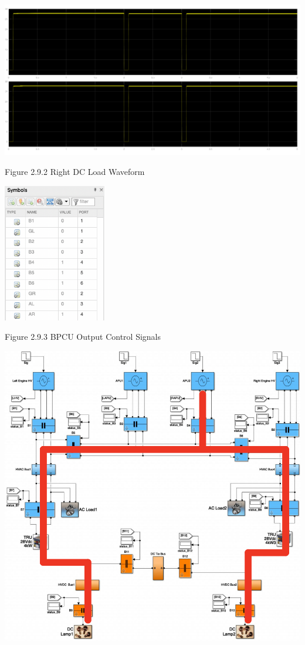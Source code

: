 \documentclass{mcmthesis}
\begin{document}
\includegraphics[trim= 0 0.255\imageheight{} 0 0, clip, width = 0.185\imageheight{}]{gl_gr_al_load2.png}
\begin{center}
\small{Figure 2.9.2 Right DC Load Waveform}
\end{center}
\begin{center}
\includegraphics[width=4.5cm]{gl_gr_al_signals.png}
\end{center}
\begin{center}
\small{Figure 2.9.3 BPCU Output Control Signals}
\end{center}
\begin{center}
\includegraphics[width=14.5cm]{gl_gr_al.png}
\end{center}
\end{document}
